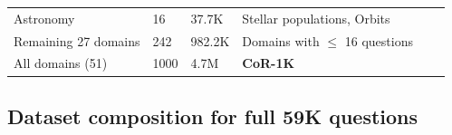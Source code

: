 \documentclass{article}
\theoremstyle{plain}
\theoremstyle{definition}
\theoremstyle{remark}
\newcommand{\data}{\textbf{CoR-1K}}
\begin{document}
\begin{table}[htbp]
\begin{tabular}{>{\raggedright}p{3.5cm} l l l l l}
Astronomy & 16 & 37.7K & Stellar populations, Orbits \\
Remaining 27 domains & 242 & 982.2K & Domains with $\leq$ 16 questions  \\
\midrule
All domains (51) & 1000 & 4.7M &  \data{}\\
\bottomrule
\end{tabular}
\label{tab:domain_distribution}
\end{table}

\subsection{Dataset composition for full 59K questions}
\end{document}
